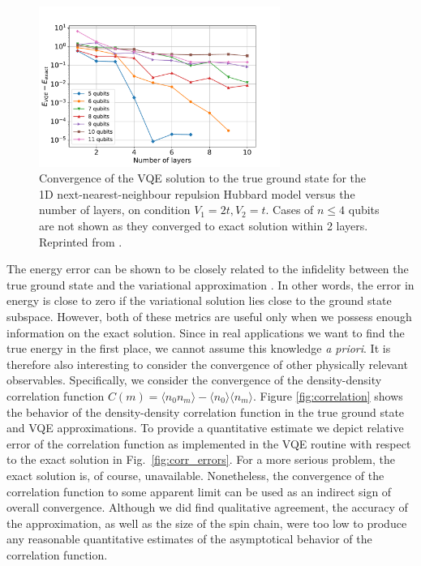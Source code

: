 \begin{figure}
    \centering
    \includegraphics[width=0.7\textwidth]{figures/vqe_hubbard_nnn.pdf}
    \caption{Convergence of the VQE solution to the true ground state for the 1D next-nearest-neighbour repulsion Hubbard model versus the number of layers, on condition $V_1 = 2t, V_2 = t$. Cases of $n \leq 4$ qubits are not shown as they converged to exact solution within 2 layers. Reprinted from \cite{uvarov_variational_2020}.}
    \label{fig:vqe_hubbard_nnn}
\end{figure}

The energy error can be shown to be closely related to the infidelity between the true ground state and the variational approximation \cite{biamonte_universal_2021}. In other words, the error in energy is close to zero if the variational solution lies close to the ground state subspace. However, both of these metrics are useful only when we possess enough information on the exact solution. Since in real applications we want to find the true energy in the first place, we cannot assume this knowledge \textit{a priori}. It is therefore also interesting to consider the convergence of other physically relevant observables. Specifically, we consider the convergence of the density-density correlation function $C(m) = \langle n_0 n_m\rangle - 
\langle n_0\rangle \langle n_m\rangle$. Figure \ref{fig:correlation} shows the behavior of the density-density correlation function in the true ground state and VQE approximations.
To provide a quantitative estimate we depict relative error of the correlation function as implemented in the VQE routine with respect to the exact solution in Fig.~\ref{fig:corr_errors}. For a more serious problem, the exact solution is, of course, unavailable. Nonetheless, the convergence of the correlation function to some apparent limit can be used as an indirect sign of overall convergence. Although we did find qualitative agreement, the accuracy of the approximation, as well as the size of the spin chain, were too low to produce any reasonable quantitative estimates of the asymptotical behavior of the correlation function. 

